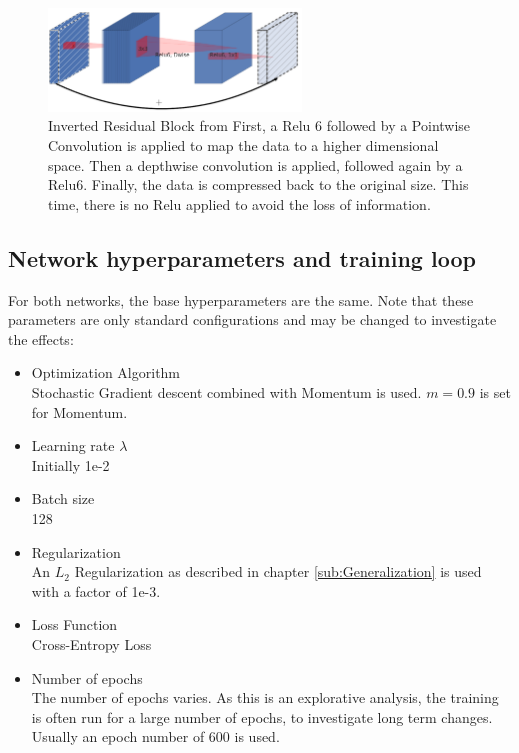 \begin{figure}[h]\label{fig:InvRes}
    \centering
    \includegraphics[width=0.6\textwidth]{images/Inverted_Residual.png}
    \caption{Inverted Residual Block from \cite[Page 3]{sandler2018mobilenetv2}\newline 
    First, a Relu 6 followed by a Pointwise Convolution is applied to map the
     data to a higher dimensional space. Then a depthwise convolution is
     applied, followed again by a Relu6. Finally, the data is compressed back to
     the original size. This time, there is no Relu applied to avoid the loss of
     information.}
\end{figure}


\subsection{Network hyperparameters and training loop}\label{sub:Hyperparameters}
For both networks, the base hyperparameters are the same. Note that these
parameters are only standard configurations and may be changed to investigate
the effects:
\begin{itemize}
    \item Optimization Algorithm \\Stochastic Gradient descent combined with
    Momentum is used. $m=0.9$ is set for Momentum.
    \item Learning rate $\lambda$ \\Initially 1e-2
    \item Batch size \\128
    \item Regularization \\An $L_2$ Regularization as described in chapter
    \ref{sub:Generalization} is used with a factor of 1e-3.
    \item Loss Function \\Cross-Entropy Loss
    \item Number of epochs \\The number of epochs varies. As this is an
    explorative analysis, the training is often run for a large number of
    epochs, to investigate long term changes. Usually an epoch number of 600 is
    used.
\end{itemize}

